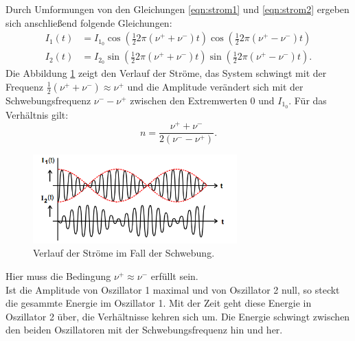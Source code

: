  Durch Umformungen von den Gleichungen \eqref{eqn:strom1} und \eqref{eqn:strom2} ergeben sich anschließend folgende Gleichungen:
 \begin{align}
   I_1(t)&=I_{1_0}\cos\left(\frac{1}{2}2\pi(\nu^{+}+\nu^{-})t\right)\cos\left(\frac{1}{2}2\pi(\nu^{+}-\nu^{-})t\right)\\
   I_2(t)&=I_{2_0}\sin\left(\frac{1}{2}2\pi(\nu^{+}+\nu^{-})t\right)\sin\left(\frac{1}{2}2\pi(\nu^{+}-\nu^{-})t\right).
  \end{align}
\newpage
Die Abbildung \ref{abb:schwebung} zeigt den Verlauf der Ströme, das System schwingt mit der Frequenz $\frac{1}{2}(\nu^{+}+\nu^{-})\approx\nu^{+}$
und die Amplitude verändert sich mit der Schwebungsfrequenz $\nu^{-}-\nu^{+}$ zwischen den Extremwerten 0 und $I_{1_0}$. Für das Verhältnis gilt:\\
  \begin{equation}
    n=\frac{\nu^+ + \nu^-}{2(\nu^{-} - \nu^{+})}\label{eqn:verhaeltnis}.
  \end{equation}
  \begin{figure}[!h]
    \centering
    \includegraphics[width=0.7\textwidth]{schwebung.PNG}
    \caption{Verlauf der Ströme im Fall der Schwebung\cite{skript}.}
    \label{abb:schwebung}
    \end{figure}
  Hier muss die Bedingung $\nu^+\approx\nu^-$ erfüllt sein.
\\
  Ist die Amplitude von Oszillator 1 maximal und von Oszillator 2 null, so steckt die gesammte Energie im Oszillator 1.
  Mit der Zeit geht diese Energie in Oszillator 2 über, die Verhältnisse kehren sich um. Die Energie schwingt zwischen den beiden Oszillatoren mit der Schwebungsfrequenz hin und her.\\
